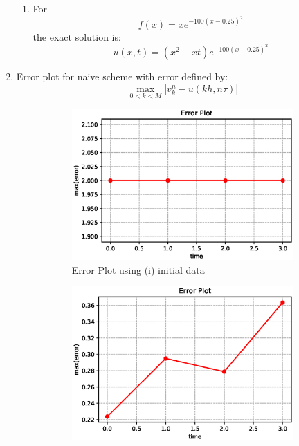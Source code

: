 \documentclass[a4paper,12pt]{article}
\begin{document}
\begin{enumerate}
\begin{enumerate}
		\item For $$f(x)=xe^{-100(x-0.25)^2}$$ the exact solution is:
		\begin{equation}
		u(x,t) = (x^2-xt)e^{-100(x-0.25)^2}
		\end{equation}
	\end{enumerate}
\item Error plot for naive scheme with error defined by:
\begin{equation*}
\max_{0<k<M} |v_k^n-u(kh,n\tau)|
\end{equation*}
\begin{figure}[h!]
	\begin{subfigure}{0.49\linewidth}
		\centering
		\includegraphics[width=\linewidth]{baapict/errori}
		\caption{Error Plot using (i) initial data}
	\end{subfigure}
\begin{subfigure}{0.49\linewidth}
	\centering
	\includegraphics[width=\linewidth]{baapict/errorii}

\end{subfigure}
\end{figure}
\end{enumerate}
\end{document}
